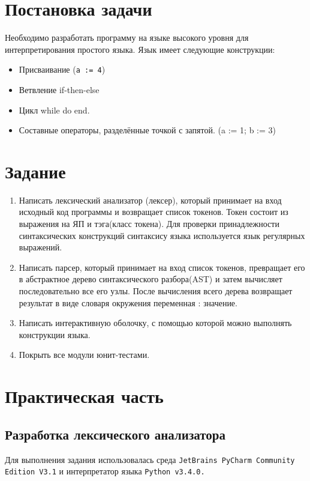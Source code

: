 \documentclass[a4paper,12pt]{article}
\begin{document}
\section{Постановка задачи}
\par Необходимо разработать программу на языке высокого уровня для интерпретирования простого языка.
Язык имеет следующие конструкции:
\begin{itemize}
	\item Присваивание (\verb|a := 4|)\\
	\item Ветвление if-then-else\\
	\item Цикл while do end.\\
	\item Составные операторы, разделённые точкой с запятой. (a := 1; b := 3)\\
\end{itemize}
\section{Задание}
\begin{enumerate}
	\item Написать лексический анализатор (лексер), который принимает на вход исходный код программы и возвращает список токенов. Токен состоит из выражения на ЯП и тэга(класс токена). Для проверки принадлежности синтаксических конструкций синтаксису языка используется язык регулярных выражений.\\
	\item Написать парсер, который принимает на вход список токенов, превращает его в абстрактное дерево синтаксического разбора(AST) и затем вычисляет последовательно все его узлы. После вычисления всего дерева возвращает результат в виде словаря окружения {переменная : значение}.
	\item Написать интерактивную оболочку, с помощью которой можно выполнять конструкции языка.
	\item Покрыть все модули юнит-тестами.
\end{enumerate}

\section{Практическая часть}

\subsection{Разработка лексического анализатора}
\par Для выполнения задания использовалась среда \verb|JetBrains PyCharm Community| \\ \verb|Edition V3.1| и интерпретатор языка \verb|Python v3.4.0.|\\
\end{document}
